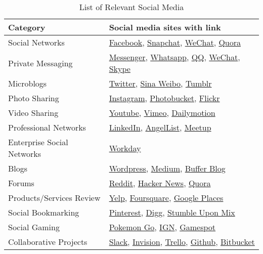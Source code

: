 \begin{table}[t]
\caption{List of Relevant Social Media}\vspace{-4mm}
{\small
\begin{tabular}{|l|l|} \hline
\textbf{Category} &  \textbf{Social media sites with link }\\\hline
Social Networks   &   \href{https://facebook.com}{Facebook}, \href{https://www.snapchat.com/}{Snapchat},  \href{https://www.wechat.com/en/}{WeChat}, \href{https://quora.com}{Quora}                     \\ \hline
Private Messaging & \href{https://messenger.com}{Messenger}, \href{https://whatsapp.com}{Whatsapp}, \href{http://www.imqq.com/}{QQ}, \href{https://www.wechat.com/en/}{WeChat}, \href{https://www.skype.com}{Skype} \\ \hline
Microblogs        &    \href{https://twitter.com}{Twitter}, \href{http://english.sina.com/weibo/}{Sina Weibo}, \href{https://tumblr.com}{Tumblr}           \\ \hline
Photo Sharing     &   \href{https://instagram.com}{Instagram}, \href{http://www.photobucket.com/}{Photobucket}, \href{https://flickr.com}{Flickr}  \\ \hline
Video Sharing     &   \href{https://www.youtube.com/}{Youtube}, \href{https://vimeo.com/}{Vimeo}, \href{https://www.dailymotion.com/us}{Dailymotion}  \\ \hline
Professional Networks &  \href{https://linkedin.com}{LinkedIn}, \href{https://angel.co/}{AngelList}, \href{http://www.meetup.com/}{Meetup}    \\ \hline
Enterprise Social Networks &  \href{https://www.workday.com/en-us/homepage.html}{Workday}   \\ \hline
Blogs             &  \href{https://wordpress.com}{Wordpress}, \href{https://medium.com}{Medium}, \href{https://buffer.com/}{Buffer Blog}   \\ \hline
Forums            &  \href{https://reddit.com}{Reddit}, \href{https://news.ycombinator.com}{Hacker News}, \href{https://quora.com}{Quora}    \\ \hline
Products/Services Review & \href{https://yelp.com}{Yelp}, \href{https://fourquare.com}{Foursquare}, \href{https://places.google.com}{Google Places} \\ \hline
Social Bookmarking &  \href{https://www.pinterest.com}{Pinterest}, \href{https://digg.com}{Digg}, \href{https://mix.com/}{Stumble Upon Mix}     \\ \hline
Social Gaming &    \href{https://www.pokemongo.com/en-us/}{Pokemon Go}, \href{https://www.ign.com/}{IGN}, \href{https://www.gamespot.com/}{Gamespot} \cite{gamestatista}       \\ \hline
Collaborative Projects &  \href{https://slack.com}{Slack}, \href{https://www.invisionapp.com/}{Invision}, \href{https://trello.com}{Trello}, \href{https://github.com}{Github}, \href{https://bitbucket.org/}{Bitbucket} \\ \hline
\end{tabular}}
\label{table:social_media_list}
\end{table}

